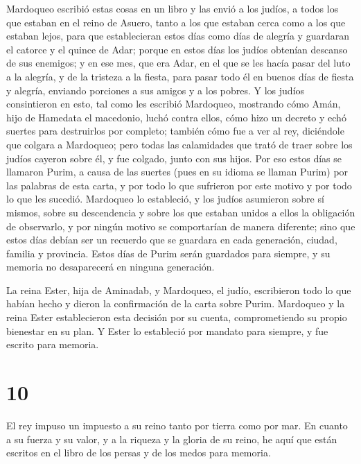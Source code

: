 Mardoqueo escribió estas cosas en un libro y las envió a
los judíos, a todos los que estaban en el reino de Asuero, tanto a los
que estaban cerca como a los que estaban lejos,  para que
establecieran estos días como días de alegría y guardaran el catorce y
el quince de Adar;  porque en estos días los judíos
obtenían descanso de sus enemigos; y en ese mes, que era Adar, en el que
se les hacía pasar del luto a la alegría, y de la tristeza a la fiesta,
para pasar todo él en buenos días de fiesta y alegría, enviando
porciones a sus amigos y a los pobres.  Y los judíos
consintieron en esto, tal como les escribió Mardoqueo, 
mostrando cómo Amán, hijo de Hamedata el macedonio, luchó contra ellos,
cómo hizo un decreto y echó suertes para destruirlos por completo;
 también cómo fue a ver al rey, diciéndole que colgara a
Mardoqueo; pero todas las calamidades que trató de traer sobre los
judíos cayeron sobre él, y fue colgado, junto con sus hijos.
 Por eso estos días se llamaron Purim, a causa de las
suertes (pues en su idioma se llaman Purim) por las palabras de esta
carta, y por todo lo que sufrieron por este motivo y por todo lo que les
sucedió.  Mardoqueo lo estableció, y los judíos asumieron
sobre sí mismos, sobre su descendencia y sobre los que estaban unidos a
ellos la obligación de observarlo, y por ningún motivo se comportarían
de manera diferente; sino que estos días debían ser un recuerdo que se
guardara en cada generación, ciudad, familia y provincia.
 Estos días de Purim serán guardados para siempre, y su
memoria no desaparecerá en ninguna generación.

 La reina Ester, hija de Aminadab, y Mardoqueo, el judío,
escribieron todo lo que habían hecho y dieron la confirmación de la
carta sobre Purim.  Mardoqueo y la reina Ester
establecieron esta decisión por su cuenta, comprometiendo su propio
bienestar en su plan.  Y Ester lo estableció por mandato
para siempre, y fue escrito para memoria.

\hypertarget{section-9}{%
\section{10}\label{section-9}}

 El rey impuso un impuesto a su reino tanto por tierra
como por mar.  En cuanto a su fuerza y su valor, y a la
riqueza y la gloria de su reino, he aquí que están escritos en el libro
de los persas y de los medos para memoria.

